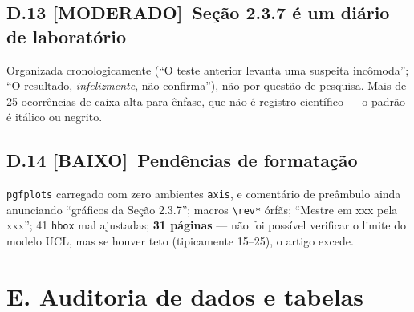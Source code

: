 \documentclass[11pt,a4paper]{article}
\newcommand{\moderado}{\textbf{\color{blue!50!black}[MODERADO]}}
\newcommand{\baixo}{\textbf{\color{gray}[BAIXO]}}
\begin{document}
\subsection*{D.13 \moderado\ Seção 2.3.7 é um diário de laboratório}

Organizada cronologicamente (``O teste anterior levanta uma suspeita incômoda''; ``O resultado,
\emph{infelizmente}, não confirma''), não por questão de pesquisa. Mais de 25 ocorrências de
caixa-alta para ênfase, que não é registro científico --- o padrão é itálico ou negrito.

\subsection*{D.14 \baixo\ Pendências de formatação}

\texttt{pgfplots} carregado com zero ambientes \texttt{axis}, e comentário de preâmbulo ainda
anunciando ``gráficos da Seção 2.3.7''; macros \texttt{\textbackslash rev*} órfãs; ``Mestre em xxx
pela xxx''; 41 \texttt{hbox} mal ajustadas; \textbf{31 páginas} --- não foi possível verificar o
limite do modelo UCL, mas se houver teto (tipicamente 15--25), o artigo excede.

\section*{E. Auditoria de dados e tabelas}
\end{document}
